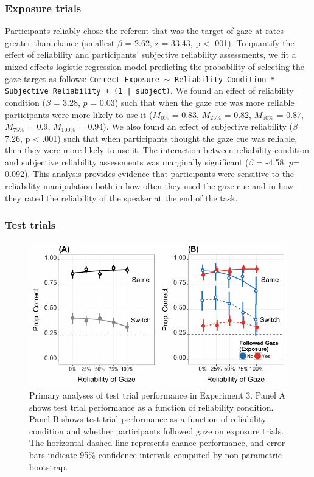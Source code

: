 \documentclass[authoryear, review]{elsarticle}
\newenvironment{CodeChunk}{}{}
\begin{document}
\subsubsection{Exposure trials}\label{exposure-trials-2}

Participants reliably chose the referent that was the target of gaze at
rates greater than chance (smallest \(\beta\) = 2.62, z = 33.43, p
\textless{} .001). To quantify the effect of reliability and
participants' subjective reliability assessments, we fit a mixed effects
logistic regression model predicting the probability of selecting the
gaze target as follows:
\texttt{Correct-Exposure $\sim$ Reliability Condition * Subjective Reliability + (1 | subject)}.
We found an effect of reliability condition (\(\beta\) = 3.28, \(p\) =
0.03) such that when the gaze cue was more reliable participants were
more likely to use it (\(M_{0\%}\) = 0.83, \(M_{25\%}\) = 0.82,
\(M_{50\%}\) = 0.87, \(M_{75\%}\) = 0.9, \(M_{100\%}\) = 0.94). We also
found an effect of subjective reliability (\(\beta\) = 7.26, p
\textless{} .001) such that when participants thought the gaze cue was
reliable, then they were more likely to use it. The interaction between
reliability condition and subjective reliability assessments was
marginally significant (\(\beta\) = -4.58, \(p\)= 0.092). This analysis
provides evidence that participants were sensitive to the reliability
manipulation both in how often they used the gaze cue and in how they
rated the reliability of the speaker at the end of the task.

\subsubsection{Test trials}\label{test-trials-2}

\begin{CodeChunk}
\begin{figure}[tb]
\includegraphics{figs/e3-plot-1} \caption[Primary analyses of test trial performance in Experiment 3]{Primary analyses of test trial performance in Experiment 3. Panel A shows test trial performance as a function of reliability condition. Panel B shows test trial performance as a function of reliability condition and whether participants followed gaze on exposure trials. The horizontal dashed line represents chance performance, and error bars indicate 95\% confidence intervals computed by non-parametric bootstrap.}\label{fig:e3-plot}
\end{figure}
\end{CodeChunk}
\end{document}
